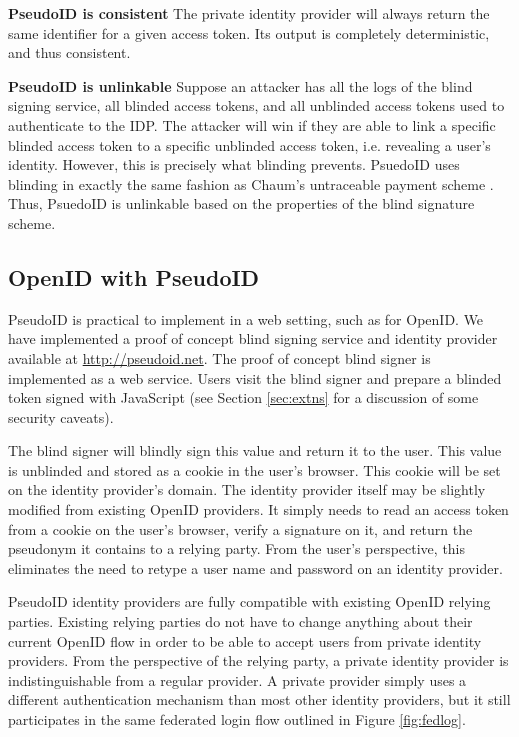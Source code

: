 \documentclass[11pt]{llncs}
\begin{document}
\begin{claim}[2]\textbf{PseudoID is consistent}
  The private identity provider will always return the same identifier
  for a given access token. Its output is completely deterministic,
  and thus consistent.
\end{claim}

\begin{claim}[3]\textbf{PseudoID is unlinkable}
  Suppose an attacker has all the logs of the blind signing service,
  all blinded access tokens, and all unblinded access tokens used to
  authenticate to the IDP. The attacker will win if they are able to
  link a specific blinded access token to a specific unblinded access
  token, i.e. revealing a user's identity. However, this is precisely
  what blinding prevents. PsuedoID uses blinding in exactly the same
  fashion as Chaum's untraceable payment scheme \cite{Cha82}. Thus,
  PsuedoID is unlinkable based on the properties of the blind
  signature scheme.
\end{claim}

\subsection{OpenID with PseudoID}

PseudoID is practical to implement in a web setting, such as for
OpenID. We have implemented a proof of concept blind signing service
and identity provider available at \url{http://pseudoid.net}. The
proof of concept blind signer is implemented as a web service. Users
visit the blind signer and prepare a blinded token signed with
JavaScript (see Section \ref{sec:extns} for a discussion of some
security caveats).

The blind signer will blindly sign this value and return it to the
user. This value is unblinded and stored as a cookie in the user's
browser. This cookie will be set on the identity provider's
domain. The identity provider itself may be slightly modified from
existing OpenID providers. It simply needs to read an access token
from a cookie on the user's browser, verify a signature on it, and
return the pseudonym it contains to a relying party. From the user's
perspective, this eliminates the need to retype a user name and
password on an identity provider.

PseudoID identity providers are fully compatible with existing OpenID
relying parties. Existing relying parties do not have to change
anything about their current OpenID flow in order to be able to accept
users from private identity providers. From the perspective of the
relying party, a private identity provider is indistinguishable from a
regular provider. A private provider simply uses a different
authentication mechanism than most other identity providers, but it
still participates in the same federated login flow outlined in Figure
\ref{fig:fedlog}.
\end{document}
